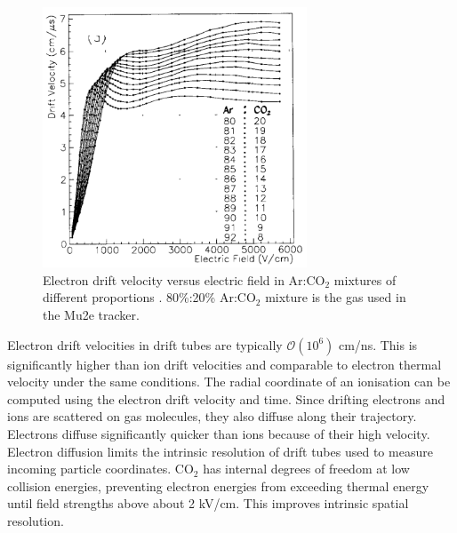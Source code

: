 \begin{figure}[!h]
    \centering
    \includegraphics[width =0.7\textwidth]{figures/png/Screenshot_20240330_102206.png}
    \caption[Electron drift velocity versus electric field in Ar:CO$_2$ mixtures.]{Electron drift velocity versus electric field in Ar:CO$_2$ mixtures of different proportions \cite{ZHAO1994485}. 
    80\%:20\% Ar:CO$_2$ mixture is the gas used in the Mu2e tracker.}
    \label{fig:drift}
\end{figure}
Electron drift velocities in drift tubes are typically $\mathcal{O}(10^6)$ cm/ns.
This is significantly higher than ion drift velocities and comparable to electron thermal velocity under the same conditions. 
The radial coordinate of an ionisation can be computed using the electron drift velocity and time.
Since drifting electrons and ions are scattered on gas molecules, they also diffuse along their trajectory. 
Electrons diffuse significantly quicker than ions because of their high velocity. Electron diffusion limits 
the intrinsic resolution of drift tubes used to measure incoming particle coordinates. CO$_2$ has internal 
degrees of freedom at low collision energies, preventing electron energies from exceeding thermal energy until 
field strengths above about 2 kV/cm. This improves intrinsic spatial resolution.
